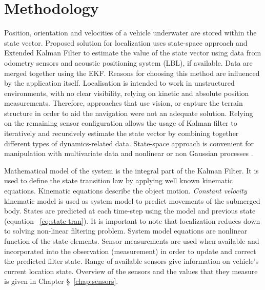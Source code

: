 \chapter{Methodology} \label{chap:methodology}
Position, orientation and velocities of a vehicle underwater are stored within the state vector. Proposed solution for localization uses state-space approach and Extended Kalman Filter to estimate the value of the state vector using data from odometry sensors and acoustic positioning system (LBL), if available. Data are merged together using the EKF. Reasons for choosing this method are influenced by the application itself. Localisation is intended to work in unstructured environments, with no clear visibility, relying on kinetic and absolute position measurements. Therefore, approaches that use vision, or capture the terrain structure in order to aid the navigation were not an adequate solution. Relying on the remaining sensor configuration allows the usage of Kalman filter to iteratively and recursively estimate the state vector by combining together different types of dynamics-related data. State-space approach is convenient for manipulation with multivariate data and nonlinear or non Gaussian processes \cite{ristic04}. 

Mathematical model of the system is the integral part of the Kalman Filter. It is used to define the state transition law by applying well known kinematic equations.  Kinematic equations describe the object motion. \textit{Constant velocity} kinematic model is used as system model to predict movements of the submerged body. States are predicted at each time-step using the model and previous state (equation ~\ref{eq:state-tran}). It is important to note that localization reduces down to solving non-linear filtering problem. System model equations are nonlinear function of the state elements. Sensor measurements are used when available and incorporated into the observation (measurement) in order to update and correct the predicted filter state. Range of available sensors give information on vehicle's current location state. Overview of the sensors and the values that they measure is given in Chapter \S~\ref{chap:sensors}.
